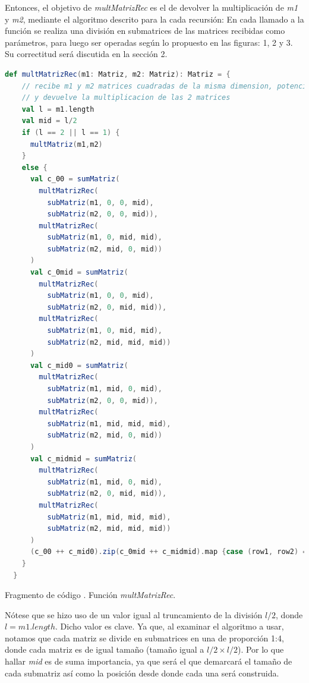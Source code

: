 \documentclass{article}
\newcounter{codesnippet}
\newcommand{\newcodesnippet}{%
  \stepcounter{codesnippet}%
}
\begin{document}
Entonces, el objetivo de \textit{multMatrizRec} es el de devolver la multiplicación de \textit{m1} y \textit{m2}, mediante el algoritmo descrito para la cada recursión: En cada llamado a la función se realiza una división en submatrices de las matrices recibidas como parámetros, para luego ser operadas según lo propuesto en las figuras: 1, 2 y 3. Su correctitud será discutida en la sección 2.

\newcodesnippet
\begin{lstlisting}[language=Scala]
  def multMatrizRec(m1: Matriz, m2: Matriz): Matriz = {
    // recibe m1 y m2 matrices cuadradas de la misma dimension, potencia de 2
    // y devuelve la multiplicacion de las 2 matrices
    val l = m1.length
    val mid = l/2
    if (l == 2 || l == 1) {
      multMatriz(m1,m2)
    }
    else {
      val c_00 = sumMatriz(
        multMatrizRec(
          subMatriz(m1, 0, 0, mid),
          subMatriz(m2, 0, 0, mid)),
        multMatrizRec(
          subMatriz(m1, 0, mid, mid),
          subMatriz(m2, mid, 0, mid))
      )
      val c_0mid = sumMatriz(
        multMatrizRec(
          subMatriz(m1, 0, 0, mid),
          subMatriz(m2, 0, mid, mid)),
        multMatrizRec(
          subMatriz(m1, 0, mid, mid),
          subMatriz(m2, mid, mid, mid))
      )
      val c_mid0 = sumMatriz(
        multMatrizRec(
          subMatriz(m1, mid, 0, mid),
          subMatriz(m2, 0, 0, mid)),
        multMatrizRec(
          subMatriz(m1, mid, mid, mid),
          subMatriz(m2, mid, 0, mid))
      )
      val c_midmid = sumMatriz(
        multMatrizRec(
          subMatriz(m1, mid, 0, mid),
          subMatriz(m2, 0, mid, mid)),
        multMatrizRec(
          subMatriz(m1, mid, mid, mid),
          subMatriz(m2, mid, mid, mid))
      )
      (c_00 ++ c_mid0).zip(c_0mid ++ c_midmid).map {case (row1, row2) => row1 ++ row2}
    }
  }
\end{lstlisting}
\begin{center}
    \small{Fragmento de código \thecodesnippet. Función \textit{multMatrizRec}.}
\end{center}

Nótese que se hizo uso de un valor igual al truncamiento de la división \(l/2\), donde \(l = m1.length\). Dicho valor es clave. Ya que, al examinar el algoritmo a usar, notamos que cada matriz se divide en submatrices en una de proporción 1:4, donde cada matriz es de igual tamaño (tamaño igual a \(l/2 \times l/2 \)). Por lo que hallar \textit{mid} es de suma importancia, ya que será el que demarcará el tamaño de cada submatriz así como la posición desde donde cada una será construida. \\
\end{document}
